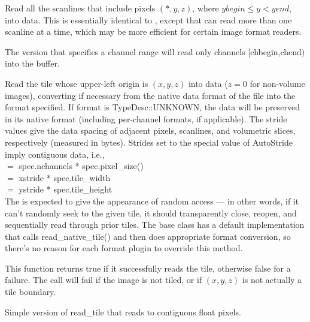 Read all the scanlines that include pixels $(*,y,z)$, where
$\mathit{ybegin} \le y < \mathit{yend}$, into {\kw data}.  This is 
essentially identical to \readscanline, except that can read more than
one scanline at a time, which may be more efficient for certain image
format readers.

The version that specifies a channel range will read only
channels $[${\cf chbegin},{\cf chend}$)$ into the buffer.
\apiend


Read the tile whose upper-left origin is $(x,y,z)$ into {\kw data}
($z=0$ for non-volume images),
converting if necessary from the native data format of the file into the 
{\kw format} specified.
If {\cf format} is {\cf TypeDesc::UNKNOWN}, the data will be preserved 
in its native format (including per-channel formats, if applicable).
The stride values
give the data spacing of adjacent pixels, scanlines, and volumetric
slices, respectively (measured in bytes).  Strides set to the special
value of {\kw AutoStride} imply contiguous data, i.e., \\
 $=$ {\kw spec.nchannels * spec.pixel_size()} \\
 $=$ {\kw xstride * spec.tile_width} \\
 $=$ {\kw ystride * spec.tile_height} \\
The \ImageInput is expected to give the appearance of random access
--- in other words, if it can't randomly seek to the given tile, it
should transparently close, reopen, and sequentially read through prior
tiles.  The base \ImageInput class has a default implementation
that calls {\cf read_native_tile()} and then does appropriate format conversion,
so there's no reason for each format plugin to override this method.

This function returns {\cf true} if it successfully reads the tile,
otherwise {\cf false} for a failure.
The call will fail if the image is not tiled, or if $(x,y,z)$ is not
actually a tile boundary.
\apiend


Simple version of {\kw read_tile} that reads to contiguous float pixels.
\apiend



